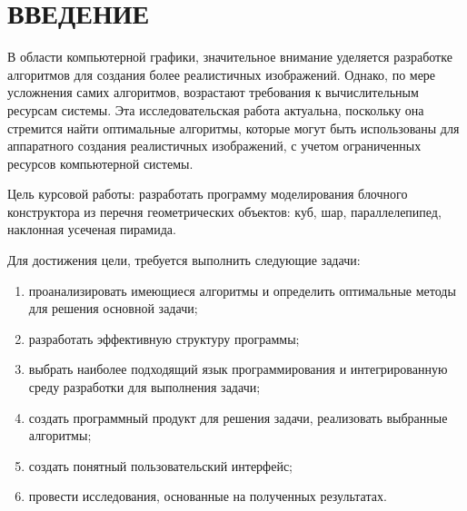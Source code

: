 \chapter*{\hfill{\centering ВВЕДЕНИЕ}\hfill}

В области компьютерной графики, значительное внимание уделяется разработке алгоритмов для создания более реалистичных изображений. 
Однако, по мере усложнения самих алгоритмов, возрастают требования к вычислительным ресурсам системы. 
Эта исследовательская работа актуальна, поскольку она стремится найти оптимальные алгоритмы, которые могут быть использованы для аппаратного создания реалистичных изображений, с учетом ограниченных ресурсов компьютерной системы.

Цель курсовой работы: разработать программу моделирования блочного конструктора из перечня геометрических объектов: куб, шар, параллелепипед, наклонная усеченая пирамида.

Для достижения цели, требуется выполнить следующие
задачи:
\begin{enumerate}[label={\arabic*)}]
	\item проанализировать имеющиеся алгоритмы и определить оптимальные методы для решения основной задачи;
	\item разработать эффективную структуру программы;
	\item выбрать наиболее подходящий язык программирования и интегрированную среду разработки для выполнения задачи;
	\item создать программный продукт для решения задачи, реализовать выбранные алгоритмы;
	\item создать понятный пользовательский интерфейс;
	\item провести исследования, основанные на полученных результатах.
\end{enumerate}